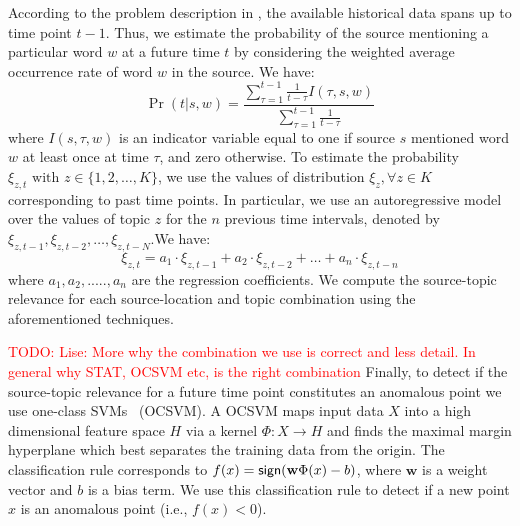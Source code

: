 \documentclass[conference]{IEEEtran}
\newcommand{\todo}[1]{\textcolor{red}{{TODO: #1}}}
\begin{document}
According to the problem description in , the available historical 
data spans up to time point $t-1$. Thus, we estimate the probability of the source 
mentioning a particular word $w$ at a future time $t$ by considering the weighted average occurrence rate of word $w$ in the source. We have:
\begin{equation}
\Pr(t|s,w) = \frac{\sum_{\tau = 1}^{t-1} \frac{1}{t - \tau}I(\tau,s,w)}{\sum_{\tau = 1}^{t-1} \frac{1}{t - \tau}}
\label{eq:prob_time}
\end{equation}
where $I(s,\tau,w)$ is an indicator variable equal to one if source $s$ mentioned word $w$ at least once at time $\tau$, and zero otherwise. 
To estimate the probability $\xi_{z,t} \mbox{ with } z \in \{1, 2, \dots, K\}$, 
we use the values of distribution $\xi_{z}, \forall z \in K$ corresponding to past time points. In particular, we use an autoregressive model over the values of topic $z$ for the $n$ previous time intervals, denoted by $\xi_{z,t-1},\xi_{z,t-2},\dots,\xi_{z,t-N}$.We have:
\begin{equation}
\xi_{z,t}=a_1 \cdot \xi_{z,t-1}+a_2\cdot \xi_{z,t-2}+\dots +a_n\cdot \xi_{z,t-n}
\end{equation}
where $a_1,a_2,.....,a_n$ are the regression coefficients.  We compute the source-topic relevance for each source-location and topic combination using the aforementioned techniques.

\todo{Lise: More why the combination we use is correct and less detail. In general why STAT, OCSVM etc, is the right combination} Finally, to detect if the source-topic relevance for a future time point constitutes an anomalous point we use one-class SVMs~\cite{schoelkopf:99} (OCSVM). A OCSVM maps input data $X$ into a high dimensional feature space $H$ via a kernel $\Phi: X \rightarrow H$ and finds the maximal margin hyperplane which best separates the training data from the origin. The classification rule corresponds to $f(x) = {\sf sign}(\mathbf{w}\Phi(x) - b)$, where $\mathbf{w}$ is a weight vector and $b$ is a bias term. We use this classification rule to detect if a new point $x$ is an anomalous point (i.e., $f(x) < 0$). 
\end{document}
